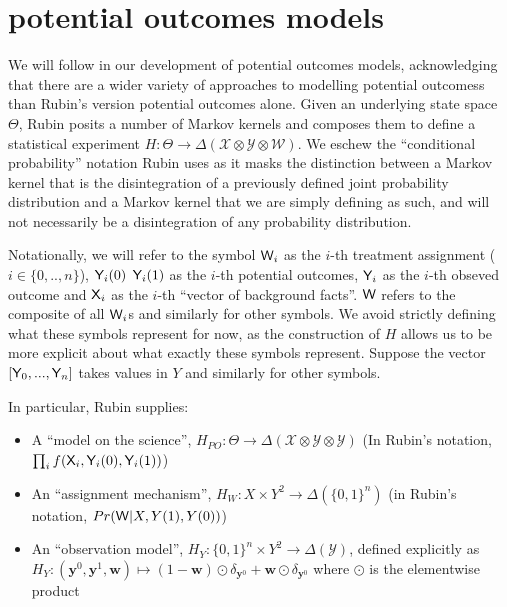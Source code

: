 
\section{potential outcomes models}

We will follow \cite{rubin_causal_2005} in our development of potential outcomes models, acknowledging that there are a wider variety of approaches to modelling potential outcomess than Rubin's version potential outcomes alone. Given an underlying state space $\Theta$, Rubin posits a number of Markov kernels and composes them to define a statistical experiment $H:\Theta\to \Delta(\mathcal{X}\otimes\mathcal{Y}\otimes \mathcal{W})$. We eschew the ``conditional probability'' notation Rubin uses as it masks the distinction between a Markov kernel that is the disintegration of a previously defined joint probability distribution and a Markov kernel that we are simply defining as such, and will not necessarily be a disintegration of any probability distribution.

Notationally, we will refer to the symbol $\mathsf{W}_i$ as the $i$-th treatment assignment ($i\in \{0,..,n\}$), $\mathsf{Y}_i(0)$ $\mathsf{Y}_i(1)$ as the $i$-th potential outcomes, $\mathsf{Y}_i$ as the $i$-th obseved outcome and $\mathsf{X}_i$ as the $i$-th ``vector of background facts''. $\mathsf{W}$ refers to the composite of all $\mathsf{W}_i$s and similarly for other symbols. We avoid strictly defining what these symbols represent for now, as the construction of $H$ allows us to be more explicit about what exactly these symbols represent. Suppose the vector $[\mathsf{Y}_0,...,\mathsf{Y}_n]$ takes values in $Y$ and similarly for other symbols.

In particular, Rubin supplies:
\begin{itemize}
\item A ``model on the science'', $H_{PO}:\Theta \to \Delta(\mathcal{X}\otimes\mathcal{Y}\otimes\mathcal{Y})$ (In Rubin's notation, $\prod_i f(\mathsf{X}_i,\mathsf{Y}_i(0),\mathsf{Y}_i(1))$)
\item An ``assignment mechanism'', $H_W:X\times Y^2 \to \Delta(\{0,1\}^n)$ (in Rubin's notation, $Pr(\mathsf{W}|X,Y(1),Y(0))$)
\item An ``observation model'', $H_Y:\{0,1\}^n\times Y^2\to \Delta(\mathcal{Y})$, defined explicitly as $H_Y:(\mathbf{y}^0,\mathbf{y}^1,\mathbf{w})\mapsto (1-\mathbf{w}) \odot \delta_{\mathbf{y}^0} + \mathbf{w} \odot \delta_{\mathbf{y}^0}$ where $\odot$ is the elementwise product
\end{itemize}

